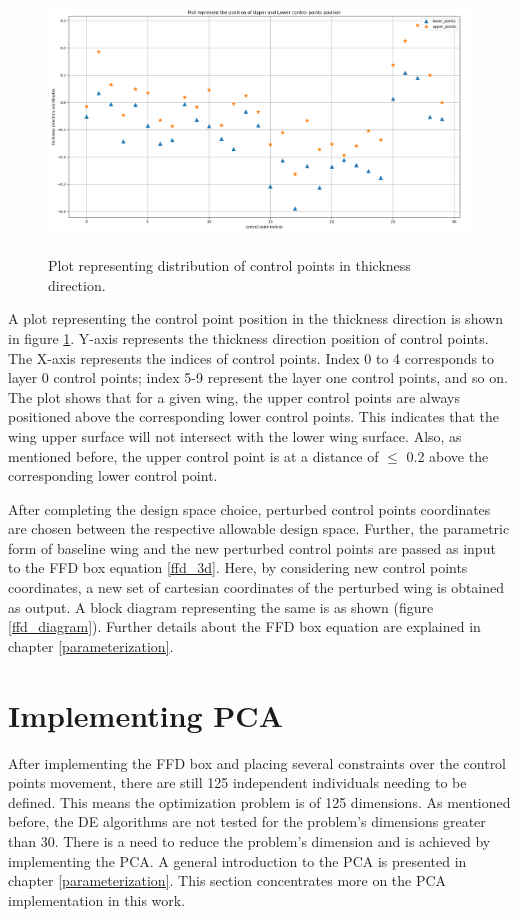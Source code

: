 \begin{figure}[!htbp]
    \centering
    \includegraphics[width=\textwidth, height=70mm]{figures/thickness_direction_plot.png}
    \caption{Plot representing distribution of control points in thickness direction.}
    \label{thickness_plot_control_point}
\end{figure}

A plot representing the control point position in the thickness direction is shown in figure \ref{thickness_plot_control_point}. Y-axis represents the thickness direction position of control points. The X-axis represents the indices of control points. Index 0 to 4 corresponds to layer 0 control points; index 5-9 represent the layer one control points, and so on. The plot shows that for a given wing, the upper control points are always positioned above the corresponding lower control points. This indicates that the wing upper surface will not intersect with the lower wing surface. Also, as mentioned before, the upper control point is at a distance of $\leq$ 0.2 above the corresponding lower control point.



After completing the design space choice, perturbed control points coordinates are chosen between the respective allowable design space. Further, the parametric form of baseline wing and the new perturbed control points are passed as input to the FFD box equation \ref{ffd_3d}. Here, by considering new control points coordinates, a new set of cartesian coordinates of the perturbed wing is obtained as output. A block diagram representing the same is as shown (figure \ref{ffd_diagram}). Further details about the FFD box equation are explained in chapter \ref{parameterization}.

\section{Implementing PCA}
After implementing the FFD box and placing several constraints over the control points movement, there are still 125 independent individuals needing to be defined. This means the optimization problem is of 125 dimensions. As mentioned before, the DE algorithms are not tested for the problem's dimensions greater than 30. There is a need to reduce the problem's dimension and is achieved by implementing the PCA. A general introduction to the PCA is presented in chapter \ref{parameterization}. This section concentrates more on the PCA implementation in this work.

